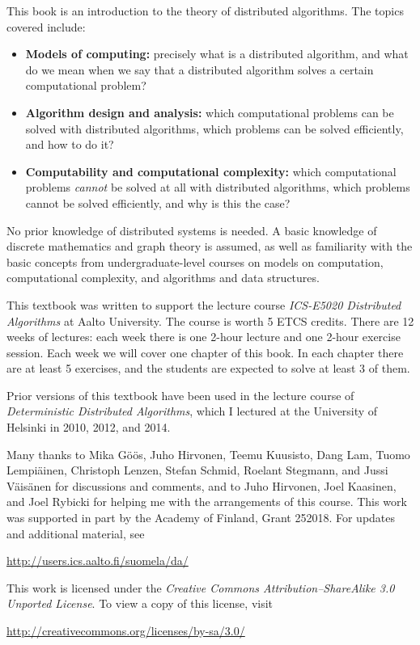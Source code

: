 
This book is an introduction to the theory of distributed algorithms. The topics covered include:
\begin{itemize}
    \item \textbf{Models of computing:} precisely what is a distributed algorithm, and what do we mean when we say that a distributed algorithm solves a certain computational problem?
    \item \textbf{Algorithm design and analysis:} which computational problems can be solved with distributed algorithms, which problems can be solved efficiently, and how to do it?
    \item \textbf{Computability and computational complexity:} which computational problems \emph{cannot} be solved at all with distributed algorithms, which problems cannot be solved efficiently, and why is this the case?
\end{itemize}
No prior knowledge of distributed systems is needed. A basic knowledge of discrete mathematics and graph theory is assumed, as well as familiarity with the basic concepts from undergraduate-level courses on models on computation, computational complexity, and algorithms and data structures.



This textbook was written to support the lecture course \emph{ICS-E5020 Distributed Algorithms} at Aalto University. The course is worth 5 ETCS credits. There are 12 weeks of lectures: each week there is one 2-hour lecture and one 2-hour exercise session. Each week we will cover one chapter of this book. In each chapter there are at least 5 exercises, and the students are expected to solve at least 3 of them.

Prior versions of this textbook have been used in the lecture course of \emph{Deterministic Distributed Algorithms}, which I lectured at the University of Helsinki in 2010, 2012, and 2014.



Many thanks to Mika G\"o\"os, Juho Hirvonen, Tee\-mu Kuu\-sisto, Dang Lam, Tuo\-mo Lem\-pi\"a\-inen, Christoph Lenzen, Stefan Schmid, Roelant Stegmann, and Jussi V\"ai\-s\"a\-nen for discussions and comments, and to Juho Hirvonen, Joel Kaasinen, and Joel Rybicki for helping me with the arrangements of this course. This work was supported in part by the Academy of Finland, Grant 252018. For updates and additional material, see
\begin{center}
    \url{http://users.ics.aalto.fi/suomela/da/}
\end{center}



\begin{samepage}
This work is licensed under the \emph{Creative Commons Attribution--ShareAlike 3.0 Unported License}. To view a copy of this license, visit
\begin{center}
    \url{http://creativecommons.org/licenses/by-sa/3.0/}
\end{center}
\end{samepage}
